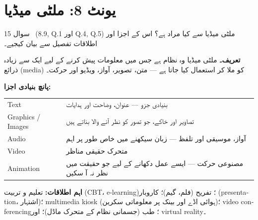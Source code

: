 \section*{یونٹ \textenglish{8}: ملٹی میڈیا}

\begin{sawal}{سوال \textenglish{15} \ \textnormal{\small(\textenglish{8.9, Q.1} اور \textenglish{Q.4}, \textenglish{Q.5})}}
ملٹی میڈیا سے کیا مراد ہے؟ اس کے اجزا اور اطلاقات تفصیل سے بیان کیجیے۔
\end{sawal}

\begin{hal}
\textbf{تعریف۔} ملٹی میڈیا وہ نظام ہے جس میں معلومات پیش کرنے کے لیے ایک سے
زیادہ ذرائع (\textenglish{media}) کو ملا کر استعمال کیا جاتا ہے --- متن، تصویر،
آواز، ویڈیو اور حرکت۔

\medskip
\textbf{پانچ بنیادی اجزا:}
\begin{center}
\begin{tabular}{@{}p{3.0cm} p{11.2cm}@{}}
\toprule
\textenglish{Text} & بنیادی جزو --- عنوان، وضاحت اور ہدایات \\
\textenglish{Graphics / Images} & تصاویر اور خاکے، جو تصور کو نظر آنے والا بناتے ہیں \\
\textenglish{Audio} & آواز، موسیقی اور تلفظ --- زبان سیکھنے میں خاص طور پر اہم \\
\textenglish{Video} & متحرک حقیقی مناظر \\
\textenglish{Animation} & مصنوعی حرکت --- ایسے عمل دکھانے کے لیے جو حقیقت میں نظر نہ آ سکیں \\
\bottomrule
\end{tabular}
\end{center}

\medskip
\textbf{اہم اطلاقات:} تعلیم و تربیت (\textenglish{CBT}، \textenglish{e-learning})؛
تفریح (فلم، گیم)؛ کاروبار (\textenglish{presentation}، اشتہار)؛
\textenglish{multimedia kiosk} (ہوائی اڈے اور بینک پر معلوماتی سکرین)؛
\textenglish{video conferencing}؛ طب (جسمانی نظام کے متحرک ماڈل)؛ اور
\textenglish{virtual reality}۔

\end{hal}

